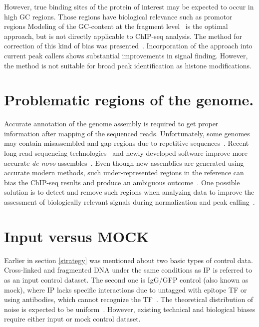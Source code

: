 However, true binding sites of the protein of interest may be expected to occur in high GC regions.
Those regions have biological relevance such as promotor regions
Modeling of the GC-content at the fragment level~\cite{benjamini2012summarizing} is the optimal approach, but is not directly applicable to ChIP-seq analysis.
The method for correction of this kind of bias was presented~\cite{teng2017accounting}.
Incorporation of the approach into current peak callers shows substantial improvements in signal finding.
However, the method is not suitable for broad peak identification as histone modifications.


 \section{Problematic regions of the genome.}

 Accurate annotation of the genome assembly is required to get proper information after mapping of the sequenced reads. 
 Unfortunately, some genomes may contain misassembled and gap regions due to repetitive sequences~\cite{amemiya2019encode}.
 Recent long-read sequencing technologies~\cite{feng2015nanopore} and newly developed software improve more accurate \textit{de novo} assembles~\cite{rice2019new}. 
 Even though new assemblies are generated using accurate modern methods, such under-represented regions in the reference can bias the ChIP-seq results and produce an ambiguous outcome~\cite{carroll2014impact}. 
 One possible solution is to detect and remove such regions when analyzing data to improve the assessment of biologically relevant signals during normalization and peak calling~\cite{amemiya2019encode}. 


 \section{Input versus MOCK}
 \label{control}

 Earlier in section \ref{strategy} was mentioned about two basic types of control data. 
 Cross-linked and fragmented DNA under the same conditions as IP is referred to as an input control dataset. 
 The second one is IgG/GFP control (also known as mock), where IP lacks specific interactions due to untagged with epitope TF or using antibodies, which cannot recognize the TF~\cite{landt2012chip, shin2013computational}.
 The theoretical distribution of noise is expected to be uniform~\cite{robertson2007genome}. 
 However, existing technical and biological biases require either input or mock control dataset.

